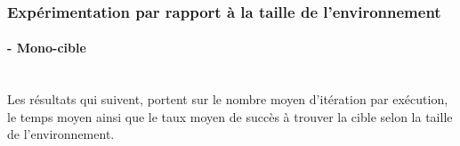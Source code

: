 
\subsubsection{Expérimentation par rapport à la taille de l'environnement}
\paragraph{- Mono-cible}
\textbf{ }\\
Les résultats qui suivent, portent sur le nombre moyen d'itération par exécution, le temps moyen ainsi que le taux moyen de succès à trouver la cible selon la taille de l'environnement.


%		




